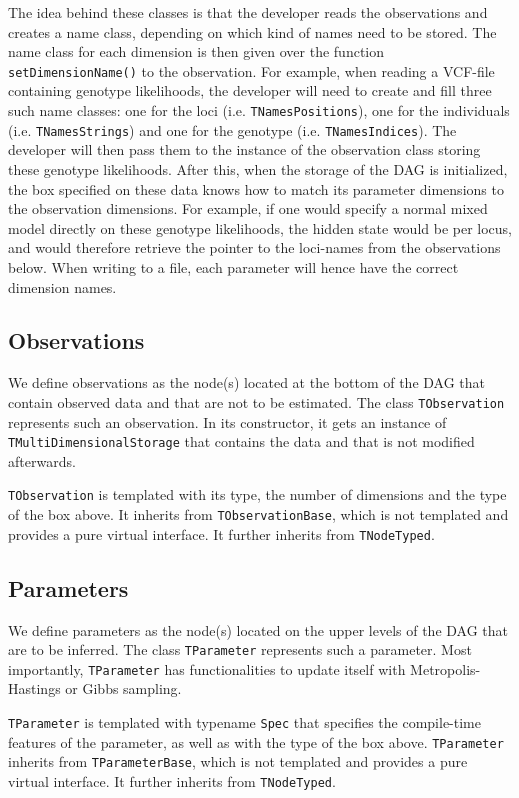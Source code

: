 \documentclass[a4paper,11pt]{article}
\newcommand{\class}[1]{\texttt{#1}}
\newcommand{\pubfunc}[1]{\texttt{#1()}}
\newcommand{\type}[1]{\texttt{#1}}
\begin{document}
The idea behind these classes is that the developer reads the observations and creates a name class, depending on which kind of names need to be stored. The name class for each dimension is then given over the function \pubfunc{setDimensionName} to the observation. For example, when reading a VCF-file containing genotype likelihoods, the developer will need to create and fill three such name classes: one for the loci (i.e. \class{TNamesPositions}), one for the individuals (i.e. \class{TNamesStrings}) and one for the genotype (i.e. \class{TNamesIndices}). The developer will then pass them to the instance of the observation class storing these genotype likelihoods. After this, when the storage of the DAG is initialized, the box specified on these data knows how to match its parameter dimensions to the observation dimensions. For example, if one would specify a normal mixed model directly on these genotype likelihoods, the hidden state would be per locus, and would therefore retrieve the pointer to the loci-names from the observations below. When writing to a file, each parameter will hence have the correct dimension names.

\subsection{Observations}
We define observations as the node(s) located at the bottom of the DAG that contain observed data and that are not to be estimated. The class \class{TObservation} represents such an observation. In its constructor, it gets an instance of \class{TMultiDimensionalStorage} that contains the data and that is not modified afterwards.

\class{TObservation} is templated with its type, the number of dimensions and the type of the box above. It inherits from \class{TObservationBase}, which is not templated and provides a pure virtual interface. It further inherits from \class{TNodeTyped}.

\subsection{Parameters}
We define parameters as the node(s) located on the upper levels of the DAG that are to be inferred. The class \class{TParameter} represents such a parameter. Most importantly, \class{TParameter} has functionalities to update itself with Metropolis-Hastings or Gibbs sampling.

\class{TParameter} is templated with typename \type{Spec} that specifies the compile-time features of the parameter, as well as with the type of the box above. \class{TParameter} inherits from \class{TParameterBase}, which is not templated and provides a pure virtual interface. It further inherits from \class{TNodeTyped}.
\end{document}
